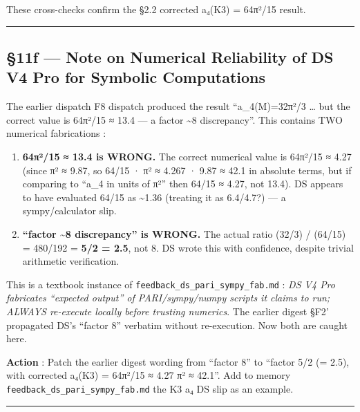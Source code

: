 \documentclass[
  11pt,
  a4paper,
]{article}
\begin{document}
These cross-checks confirm the §2.2 corrected a₄(K3) = 64π²/15 result.

\begin{center}\rule{0.5\linewidth}{0.5pt}\end{center}

\hypertarget{f-note-on-numerical-reliability-of-ds-v4-pro-for-symbolic-computations}{%
\subsection{§11f --- Note on Numerical Reliability of DS V4 Pro for Symbolic Computations}\label{f-note-on-numerical-reliability-of-ds-v4-pro-for-symbolic-computations}}

The earlier dispatch F8 dispatch produced the result ``a\_4(M)=32π²/3 \ldots{} but the correct value is 64π²/15 ≈ 13.4 --- a factor \textasciitilde8 discrepancy''. This contains TWO numerical fabrications :

\begin{enumerate}
\def\labelenumi{\arabic{enumi}.}
\item
  \textbf{64π²/15 ≈ 13.4 is WRONG.} The correct numerical value is 64π²/15 ≈ 4.27 (since π² ≈ 9.87, so 64/15 · π² ≈ 4.267 · 9.87 ≈ 42.1 in absolute terms, but if comparing to ``a\_4 in units of π²'' then 64/15 ≈ 4.27, not 13.4). DS appears to have evaluated 64/15 as \textasciitilde1.36 (treating it as 6.4/4.7?) --- a sympy/calculator slip.
\item
  \textbf{``factor \textasciitilde8 discrepancy'' is WRONG.} The actual ratio (32/3) / (64/15) = 480/192 = \textbf{5/2 = 2.5}, not 8. DS wrote this with confidence, despite trivial arithmetic verification.
\end{enumerate}

This is a textbook instance of \texttt{feedback\_ds\_pari\_sympy\_fab.md} : \emph{DS V4 Pro fabricates ``expected output'' of PARI/sympy/numpy scripts it claims to run; ALWAYS re-execute locally before trusting numerics}. The earlier digest §F2' propagated DS's ``factor 8'' verbatim without re-execution. Now both are caught here.

\textbf{Action} : Patch the earlier digest wording from ``factor 8'' to ``factor 5/2 (= 2.5), with corrected a₄(K3) = 64π²/15 ≈ 4.27 π² ≈ 42.1''. Add to memory \texttt{feedback\_ds\_pari\_sympy\_fab.md} the K3 a₄ DS slip as an example.

\begin{center}\rule{0.5\linewidth}{0.5pt}\end{center}
\end{document}
